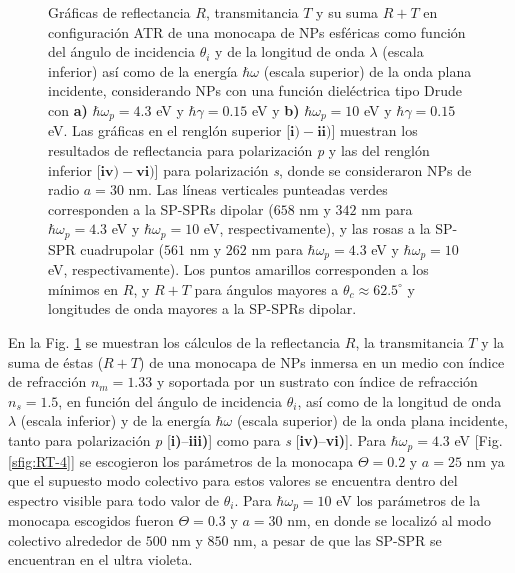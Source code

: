 \begin{figure}[h!]
\begin{subfigure}{.7\linewidth}
		\end{subfigure}\vspace*{-.5em}
	\caption{Gráficas de reflectancia $R$, transmitancia $T$ y su suma $R+T$ en configuración ATR de una monocapa de NPs esféricas como función del ángulo de incidencia $\theta_i$ y de la longitud de onda $\lambda$ (escala inferior) así como de la energía $\hbar\omega$ (escala superior) de la onda plana incidente, considerando NPs con una función dieléctrica tipo Drude con \textbf{a)} $\hbar\omega_p=4. 3$ eV  y  $\hbar\gamma=0. 15$ eV y \textbf{b)} $\hbar\omega_p = 10$ eV y $\hbar\gamma = 0.15$ eV.  Las gráficas   en el renglón superior [$\mathbf{i)-ii)}$]  muestran los resultados de reflectancia para  polarización \emph{p} y las del renglón inferior  [$\mathbf{iv)-vi)}$] para polarización  \emph{s}, donde se consideraron NPs de radio $a=30$ nm. Las líneas verticales punteadas verdes corresponden a la SP-SPRs dipolar ($658$ nm y $342$ nm para $\hbar\omega_p=4.3$ eV y $\hbar\omega_p = 10$ eV, respectivamente), y las rosas a la SP-SPR cuadrupolar ($561$ nm y $262$ nm para $\hbar\omega_p=4.3$ eV y $\hbar\omega_p = 10$ eV, respectivamente). Los puntos amarillos corresponden a los mínimos en $R$, y $R+T$ para ángulos mayores a $\theta_c\approx 62.5^\circ$ y longitudes de onda mayores a la SP-SPRs dipolar. }\label{fig:RT-Omegas}
	\end{figure}	

En la Fig. \ref{fig:RT-Omegas} se muestran los cálculos de la reflectancia $R$, la transmitancia $T$ y la suma de éstas ($R+T$) de una monocapa de NPs inmersa en un medio con índice de refracción $n_m=1.33$ y soportada por un sustrato con índice de refracción $n_s=1.5$, en función del ángulo de incidencia $\theta_i$, así como de la longitud de onda $\lambda$ (escala inferior) y de la energía  $\hbar\omega$ (escala superior) de la onda plana incidente, tanto para polarización \emph{p}  [\textbf{i)}--\textbf{iii)}] como para \emph{s} [\textbf{iv)}--\textbf{vi)}]. Para $\hbar\omega_p=4.3$ eV [Fig. \ref{sfig:RT-4}] se escogieron los parámetros de la monocapa $\Theta=0.2$ y $a=25$ nm ya que el supuesto modo colectivo para estos valores se encuentra dentro del espectro visible para todo valor de $\theta_i$. Para $\hbar\omega_p=10$ eV los parámetros de la monocapa escogidos fueron $\Theta=0.3$ y $a=30$ nm, en donde se localizó al modo colectivo alrededor de $500$ nm y $850$ nm, a pesar de que las SP-SPR se encuentran en el ultra violeta.

